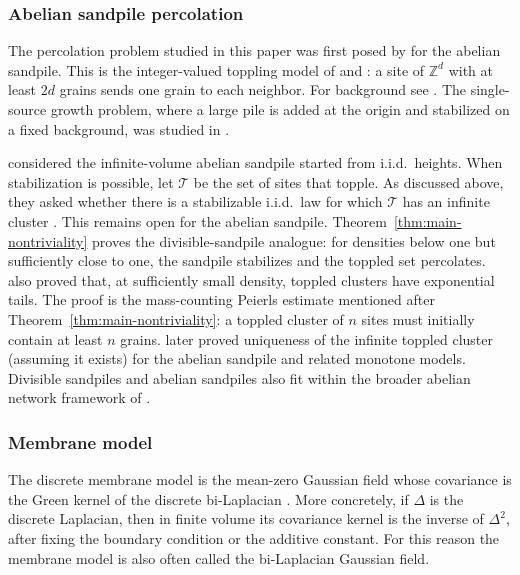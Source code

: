 \documentclass[11pt]{amsart}
\theoremstyle{plain}
\theoremstyle{definition}
\newcommand{\Z}{\mathbb{Z}}
\begin{document}
\subsubsection{Abelian sandpile percolation}\label{ssec:abelian-percolation}

The percolation problem studied in this paper was first posed by
\citet*{FMR} for the abelian sandpile. This is the integer-valued toppling
model of \citet*{BakTangWiesenfeld} and \citet*{Dhar90}: a site of $\Z^d$
with at least $2d$ grains sends one grain to each neighbor. For background
see
\citep{MeesterRedigZnamenski,Redig,HolroydLevineMeszarosPeresProppWilson,Jarai,LevinePropp}.
The single-source growth problem, where a large pile is added at the origin
and stabilized on a fixed background, was studied in
\citep{LiuKaplanGray,Ostojic,DharSadhuChandra,SadhuDharSinks,FeyLevinePeres,FeyRedigShapes,PegdenSmart,LevinePegdenSmartAbelian,LevinePegdenSmart,BouRabeeRandomASM,BouRabeeDimReduction,BouRabeeExploding,BouRabeeFLattice}.


\citet*{FMR} considered the infinite-volume abelian sandpile started from
i.i.d.\ heights. When stabilization is possible, let $\mathcal T$ be the set
of sites that topple. As discussed above, they asked
whether there is a stabilizable i.i.d.\ law for which $\mathcal T$ has an
infinite cluster \citep[Section~5]{FMR}. This remains open
for the abelian sandpile. Theorem~\ref{thm:main-nontriviality} proves the
divisible-sandpile analogue: for densities below one but sufficiently close to
one, the sandpile stabilizes and the toppled set percolates.  \citet*{FMR}
also proved that, at sufficiently small density,
toppled clusters have exponential tails. The proof is the mass-counting
Peierls estimate mentioned after
Theorem~\ref{thm:main-nontriviality}: a toppled cluster of $n$ sites must
initially contain at least $n$ grains.
\citet*{PanStauffer} later proved uniqueness of the infinite toppled cluster (assuming it exists)
for the abelian sandpile and related monotone models. Divisible sandpiles and
abelian sandpiles also fit within the broader abelian network framework of
\citet*{BondLevineI,ChanLevineIV}.

\subsubsection{Membrane model}

The discrete membrane model is the mean-zero Gaussian field whose covariance is the
Green kernel of the discrete bi-Laplacian \citep{Kurt09,CDH}. More
concretely, if $\Delta$ is the discrete Laplacian, then in finite volume its
covariance kernel is the inverse of $\Delta^2$, after fixing the boundary
condition or the additive constant. For this reason the membrane model is
also often called the bi-Laplacian Gaussian field.
\end{document}
